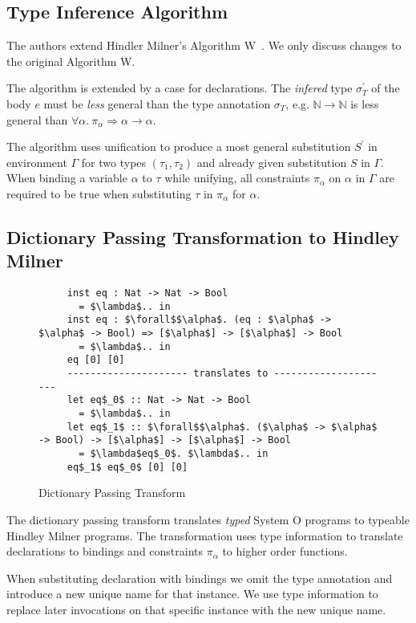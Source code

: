\documentclass[runningheads]{llncs}
\newcommand{\snip}[1]{\footnotesize{\ttfamily{#1}}}
\begin{document}
\subsection{Type Inference Algorithm}
The authors extend Hindler Milner's Algorithm W~\cite{hm78}. We only discuss changes to the original Algorithm W.

The algorithm is extended by a case for \snip{inst} declarations. The \emph{infered} type $\sigma_T^\prime$ of the body $e$ must be \emph{less} general than the type annotation $\sigma_T$, e.g. $\mathbb{N} \rightarrow \mathbb{N}$ is less general than $\forall \alpha. \ \pi_\alpha \Rightarrow \alpha \rightarrow \alpha$.

The algorithm uses unification to produce a most general substitution $S^\prime$ in environment $\Gamma$ for two types $(\tau_1, \tau_2)$ and already given substitution $S$ in $\Gamma$. When binding a variable $\alpha$ to $\tau$ while unifying, all constraints $\pi_\alpha$ on $\alpha$ in $\Gamma$ are required to be true when substituting $\tau$ in $\pi_\alpha$ for $\alpha$.
\subsection{Dictionary Passing Transformation to Hindley Milner}
\begin{figure}
  \begin{lstlisting}
     inst eq : Nat -> Nat -> Bool 
       = $\lambda$.. in                 
     inst eq : $\forall$$\alpha$. (eq : $\alpha$ -> $\alpha$ -> Bool) => [$\alpha$] -> [$\alpha$] -> Bool 
       = $\lambda$.. in
     eq [0] [0]
     --------------------- translates to ---------------------
     let eq$_0$ :: Nat -> Nat -> Bool
       = $\lambda$.. in
     let eq$_1$ :: $\forall$$\alpha$. ($\alpha$ -> $\alpha$ -> Bool) -> [$\alpha$] -> [$\alpha$] -> Bool     
       = $\lambda$eq$_0$. $\lambda$.. in
     eq$_1$ eq$_0$ [0] [0]  
  \end{lstlisting}
  \caption{Dictionary Passing Transform} \label{transform}
\end{figure}
The dictionary passing transform translates \emph{typed} System O programs to typeable Hindley Milner programs. The transformation uses type information to translate \snip{inst} declarations to \snip{let} bindings and constraints $\pi_\alpha$ to higher order functions. 

When substituting \snip{inst} declaration with \snip{let} bindings we omit the type annotation and introduce a new unique name for that instance. We  use type information to replace later invocations on that specific instance with the new unique name. 
\end{document}
